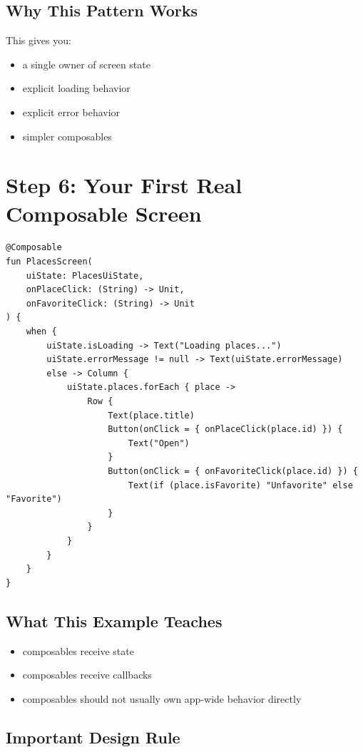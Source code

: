 \documentclass[11pt,a4paper]{article}
\begin{document}
\subsection{Why This Pattern Works}

This gives you:
\begin{itemize}
    \item a single owner of screen state
    \item explicit loading behavior
    \item explicit error behavior
    \item simpler composables
\end{itemize}

\section{Step 6: Your First Real Composable Screen}

\begin{lstlisting}[style=kazekotlin]
@Composable
fun PlacesScreen(
    uiState: PlacesUiState,
    onPlaceClick: (String) -> Unit,
    onFavoriteClick: (String) -> Unit
) {
    when {
        uiState.isLoading -> Text("Loading places...")
        uiState.errorMessage != null -> Text(uiState.errorMessage)
        else -> Column {
            uiState.places.forEach { place ->
                Row {
                    Text(place.title)
                    Button(onClick = { onPlaceClick(place.id) }) {
                        Text("Open")
                    }
                    Button(onClick = { onFavoriteClick(place.id) }) {
                        Text(if (place.isFavorite) "Unfavorite" else "Favorite")
                    }
                }
            }
        }
    }
}
\end{lstlisting}

\subsection{What This Example Teaches}

\begin{itemize}
    \item composables receive state
    \item composables receive callbacks
    \item composables should not usually own app-wide behavior directly
\end{itemize}

\subsection{Important Design Rule}
\end{document}
